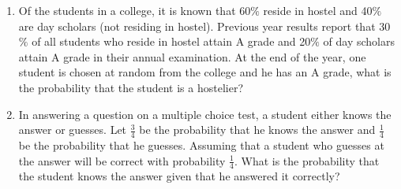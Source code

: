 \begin{enumerate}[label=\thesection.\arabic*.,ref=\thesection.\theenumi]
\item Of the students in a college, it is known that 60$\%$ reside in hostel and 40$\%$ are day scholars (not residing in hostel). Previous year results report that 30$\%$ of all students who reside in hostel attain A grade and 20$\%$ of day scholars attain A grade in their annual examination. At the end of the year, one student is chosen at random from the college and he has an A grade, what is the probability that the student is a hostelier?\\
\solution


\item In answering a question on a multiple choice test, a student either knows the
answer or guesses. Let $\frac{3}{4}$ be the probability that he knows the answer and $\frac{1}{4}$ be the probability that he guesses. Assuming that a student who guesses at the answer will be correct with probability $\frac{1}{4}$. What is the probability that the student knows the answer given that he answered it correctly?\\
\solution


\end{enumerate}
